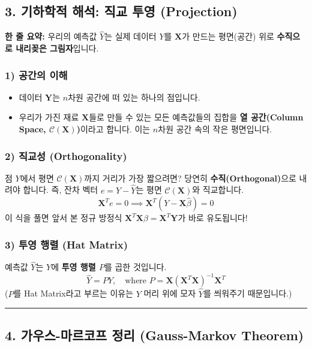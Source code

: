 \documentclass[11pt,a4paper]{book}
\theoremstyle{definition}
\begin{document}
\subsection{3. 기하학적 해석: 직교 투영 (Projection)}


\begin{conceptbox}[title={개념 3: 그림자 놀이}]
\textbf{한 줄 요약:} 우리의 예측값 $\hat{Y}$는 실제 데이터 $Y$를 $\mathbf{X}$가 만드는 평면(공간) 위로 \textbf{수직으로 내리꽂은 그림자}입니다.
\end{conceptbox}

\subsubsection*{1) 공간의 이해}
\begin{itemize}
    \item 데이터 $\mathbf{Y}$는 $n$차원 공간에 떠 있는 하나의 점입니다.
    \item 우리가 가진 재료 $\mathbf{X}$들로 만들 수 있는 모든 예측값들의 집합을 \textbf{열 공간(Column Space, $\mathcal{C}(\mathbf{X})$)}이라고 합니다. 이는 $n$차원 공간 속의 작은 평면입니다.
\end{itemize}

\subsubsection*{2) 직교성 (Orthogonality)}
점 $Y$에서 평면 $\mathcal{C}(\mathbf{X})$까지 거리가 가장 짧으려면? 당연히 \textbf{수직(Orthogonal)}으로 내려야 합니다.
즉, 잔차 벡터 $e = Y - \hat{Y}$는 평면 $\mathcal{C}(\mathbf{X})$와 직교합니다.
$$ \mathbf{X}^T e = 0 \implies \mathbf{X}^T (Y - \mathbf{X}\hat{\beta}) = 0 $$
이 식을 풀면 앞서 본 정규 방정식 $\mathbf{X}^T \mathbf{X} \beta = \mathbf{X}^T \mathbf{Y}$가 바로 유도됩니다!

\subsubsection*{3) 투영 행렬 (Hat Matrix)}
예측값 $\hat{Y}$는 $Y$에 \textbf{투영 행렬 $P$}를 곱한 것입니다.
$$ \hat{Y} = P Y, \quad \text{where } P = \mathbf{X}(\mathbf{X}^T \mathbf{X})^{-1} \mathbf{X}^T $$
($P$를 Hat Matrix라고 부르는 이유는 $Y$ 머리 위에 모자 $\hat{Y}$를 씌워주기 때문입니다.)

\vspace{0.5cm}\hrule\vspace{0.5cm}

\subsection{4. 가우스-마르코프 정리 (Gauss-Markov Theorem)}
\end{document}
